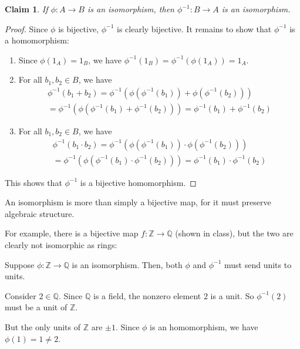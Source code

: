 \documentclass[a4paper,12pt]{report}
\newcounter{statement}
\numberwithin{statement}{chapter}
\newtheorem{claim}[statement]{Claim}
\numberwithin{equation}{chapter}
\numberwithin{section}{chapter}
\numberwithin{subsection}{section}
\begin{document}
\begin{claim}
If $\phi:A \rightarrow B$ is an isomorphism, then $\phi^{-1} : B \rightarrow A$ is an isomorphism.
\end{claim}
\begin{proof}

Since $\phi$ is bijective, $\phi^{-1}$ is clearly bijective.  It remains to show that $\phi^{-1}$ is a homomorphism:
\begin{enumerate}
\item 
Since $\phi(1_A) = 1_B$, we have $\phi^{-1}(1_B) = \phi^{-1}(\phi(1_A)) = 1_A$.

\item 
For all $b_1, b_2 \in B$, we have
\begin{multline*}
\phi^{-1}(b_1 + b_2) = \phi^{-1}(\phi(\phi^{-1}(b_1)) + \phi(\phi^{-1}(b_2)))
\\= \phi^{-1}(\phi(\phi^{-1}(b_1) + \phi^{-1}(b_2))) = \phi^{-1}(b_1) + \phi^{-1}(b_2)
\end{multline*}

\item 
For all $b_1, b_2 \in B$, we have
\begin{multline*}
\phi^{-1}(b_1 \cdot b_2) = \phi^{-1}(\phi(\phi^{-1}(b_1)) \cdot \phi(\phi^{-1}(b_2)))
\\= \phi^{-1}(\phi(\phi^{-1}(b_1) \cdot \phi^{-1}(b_2))) = \phi^{-1}(b_1) \cdot \phi^{-1}(b_2)
\end{multline*}
\end{enumerate}
This shows that $\phi^{-1}$ is a bijective homomorphism.


\end{proof}




An isomorphism is more than simply a bijective map,
for it must preserve algebraic structure.


For example, there is a bijective map
$f : \mathbb{Z} \rightarrow \mathbb{Q}$ (shown in class),
but the two are clearly not isomorphic as rings:


Suppose $\phi : \mathbb{Z}\rightarrow \mathbb{Q}$
is an isomorphism.
Then, both $\phi$ and $\phi^{-1}$ must send units to units.


Consider $2 \in \mathbb{Q}$.
Since $\mathbb{Q}$ is a field, the nonzero element $2$ is a unit.
So $\phi^{-1}(2)$ must be a unit of $\mathbb{Z}$.


But the only units of $\mathbb{Z}$ are $\pm 1$.
Since $\phi$ is an homomorphism, we have $\phi(1) = 1 \neq 2$.
\end{document}
